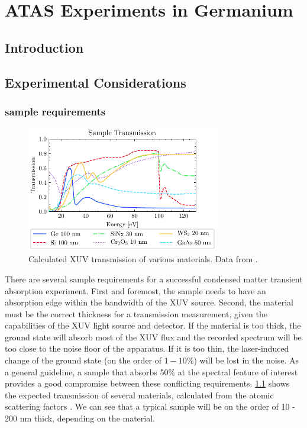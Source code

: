 \chapter{ATAS Experiments in Germanium}

\section{Introduction}

\section{Experimental Considerations}

\subsection{sample requirements}

\begin{figure}
	\centering
	\includegraphics[width=0.75\textwidth]{figures/chap4/Sample_transmission_CXRO.pdf}
	\caption{Calculated XUV transmission of various materials. Data from \cite{gulliksonCXROXRayInteractions}.}
	\label{fig:Sample_trans_CXRO}
\end{figure}

There are several sample requirements for a successful condensed matter transient absorption experiment. First and foremost, the sample needs to have an absorption edge within the bandwidth of the XUV source. Second, the material must be the correct thickness for a transmission measurement, given the capabilities of the XUV light source and detector. If the material is too thick, the ground state will absorb most of the XUV flux and the recorded spectrum will be too close to the noise floor of the apparatus. If it is too thin, the laser-induced change of the ground state (on the order of $1-10\%$) will be lost in the noise. As a general guideline, a sample that absorbs 50\% at the spectral feature of interest provides a good compromise between these conflicting requirements. \cref{fig:Sample_trans_CXRO} shows the expected transmission of several materials, calculated from the atomic scattering factors \cite{gulliksonCXROXRayInteractions}. We can see that a typical sample will be on the order of 10 - 200 nm thick, depending on the material.

